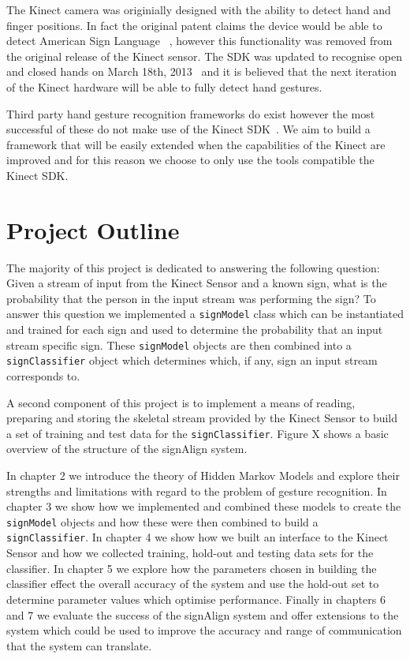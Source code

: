 The Kinect camera was originially designed with the ability to detect hand and finger positions. In fact the original patent claims the device would be able to detect American Sign Language ~\citep{LATTA:2010:biblatex}, however this functionality was removed from the original release of the Kinect sensor. The SDK was updated to recognise open and closed hands on March 18th, 2013~\citep{Microsoft:2013:Online} and it is believed that the next iteration of the Kinect hardware will be able to fully detect hand gestures.

Third party hand gesture recognition frameworks do exist however the most successful of these do not make use of the Kinect SDK~\citep{Forth:2013:Online}. We aim to build a framework that will be easily extended when the capabilities of the Kinect are improved and for this reason we choose to only use the tools compatible the Kinect SDK.

\section{Project Outline}
The majority of this project is dedicated to answering the following question: Given a stream of input from the Kinect Sensor and a known sign, what is the probability that the person in the input stream was performing the sign? To  answer this question we implemented a \verb|signModel| class which can be instantiated and trained for each sign and used to determine the probability that an input stream specific sign. These \verb|signModel| objects are then combined into a \verb|signClassifier| object which determines which, if any, sign an input stream corresponds to.

A second component of this project is to implement a means of reading, preparing and storing the skeletal stream provided by the Kinect Sensor to build a set of training and test data for the \verb|signClassifier|. Figure X shows a basic overview of the structure of the signAlign system.

In chapter 2 we introduce the theory of Hidden Markov Models and explore their strengths and limitations with regard to the problem of gesture recognition. In chapter 3 we show how we implemented and combined these models to create the \verb|signModel| objects and how these were then combined to build a \verb|signClassifier|. In chapter 4 we show how we built an interface to the Kinect Sensor and how we collected training, hold-out and testing data sets for the classifier. In chapter 5 we explore how the parameters chosen in building the classifier effect the overall accuracy of the system and use the hold-out set to determine parameter values which optimise performance. Finally in chapters 6 and 7 we evaluate the success of the signAlign system and offer extensions to the system which could be used to improve the accuracy and range of communication that the system can translate.




